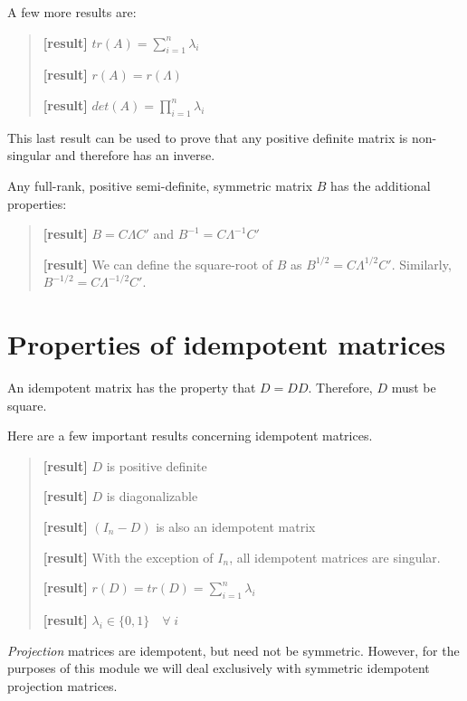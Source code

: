 \documentclass[
  letterpaper,
  DIV=11,
  numbers=noendperiod]{scrreprt}
\begin{document}
A few more results are:

\begin{quote}
\textbf{{[}result{]}} \(tr(A) = \sum_{i=1}^n\lambda_i\)

\textbf{{[}result{]}} \(r(A) = r(\Lambda)\)

\textbf{{[}result{]}} \(det(A) = \prod_{i=1}^n \lambda_i\)
\end{quote}

This last result can be used to prove that any positive definite matrix
is non-singular and therefore has an inverse.

Any full-rank, positive semi-definite, symmetric matrix \(B\) has the
additional properties:

\begin{quote}
\textbf{{[}result{]}} \(B=C\Lambda C'\) and \(B^{-1} = C\Lambda^{-1}C'\)

\textbf{{[}result{]}} We can define the square-root of \(B\) as
\(B^{1/2} = C\Lambda^{1/2}C'\). Similarly,
\(B^{-1/2} = C\Lambda^{-1/2}C'\).
\end{quote}

\hypertarget{properties-of-idempotent-matrices}{%
\section{Properties of idempotent
matrices}\label{properties-of-idempotent-matrices}}

An idempotent matrix has the property that \(D=DD\). Therefore, \(D\)
must be square.

Here are a few important results concerning idempotent matrices.

\begin{quote}
\textbf{{[}result{]}} \(D\) is positive definite

\textbf{{[}result{]}} \(D\) is diagonalizable

\textbf{{[}result{]}} \((I_n-D)\) is also an idempotent matrix

\textbf{{[}result{]}} With the exception of \(I_n\), all idempotent
matrices are singular.

\textbf{{[}result{]}} \(r(D) = tr(D) = \sum_{i=1}^n\lambda_i\)

\textbf{{[}result{]}} \(\lambda_i\in\{0,1\}\quad \forall\;i\)
\end{quote}

\emph{Projection} matrices are idempotent, but need not be symmetric.
However, for the purposes of this module we will deal exclusively with
symmetric idempotent projection matrices.
\end{document}
